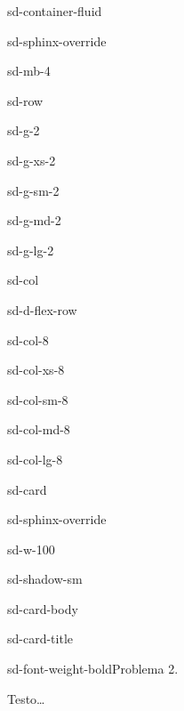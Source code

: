 \documentclass[letterpaper,10pt,italian]{jupyterBook}
\begin{document}
\begin{sphinxuseclass}{sd-container-fluid}
\begin{sphinxuseclass}{sd-sphinx-override}
\begin{sphinxuseclass}{sd-mb-4}
\begin{sphinxuseclass}{sd-row}
\begin{sphinxuseclass}{sd-g-2}
\begin{sphinxuseclass}{sd-g-xs-2}
\begin{sphinxuseclass}{sd-g-sm-2}
\begin{sphinxuseclass}{sd-g-md-2}
\begin{sphinxuseclass}{sd-g-lg-2}
\begin{sphinxuseclass}{sd-col}
\begin{sphinxuseclass}{sd-d-flex-row}
\begin{sphinxuseclass}{sd-col-8}
\begin{sphinxuseclass}{sd-col-xs-8}
\begin{sphinxuseclass}{sd-col-sm-8}
\begin{sphinxuseclass}{sd-col-md-8}
\begin{sphinxuseclass}{sd-col-lg-8}
\begin{sphinxuseclass}{sd-card}
\begin{sphinxuseclass}{sd-sphinx-override}
\begin{sphinxuseclass}{sd-w-100}
\begin{sphinxuseclass}{sd-shadow-sm}
\begin{sphinxuseclass}{sd-card-body}
\begin{sphinxuseclass}{sd-card-title}
\begin{sphinxuseclass}{sd-font-weight-bold}Problema 2.
\end{sphinxuseclass}
\end{sphinxuseclass}
\sphinxAtStartPar
Testo…


\end{sphinxuseclass}
\end{sphinxuseclass}
\end{sphinxuseclass}
\end{sphinxuseclass}
\end{sphinxuseclass}
\end{sphinxuseclass}
\end{sphinxuseclass}
\end{sphinxuseclass}
\end{sphinxuseclass}
\end{sphinxuseclass}
\end{sphinxuseclass}
\end{sphinxuseclass}
\end{sphinxuseclass}
\end{sphinxuseclass}
\end{sphinxuseclass}
\end{sphinxuseclass}
\end{sphinxuseclass}
\end{sphinxuseclass}
\end{sphinxuseclass}
\end{sphinxuseclass}
\end{sphinxuseclass}
\end{document}
